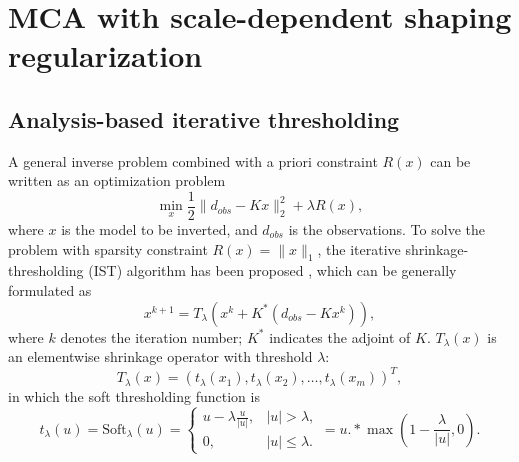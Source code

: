 \section{MCA with scale-dependent shaping regularization}

\subsection{Analysis-based iterative thresholding}

A general inverse problem combined with a priori constraint $R(x)$ can be written as an optimization problem
\begin{equation}\label{eq:sparsity3}
  \min_x \frac{1}{2}\|d_{obs}-K x\|_2^2+\lambda R(x),
\end{equation}
where $x$ is the model to be inverted, and $d_{obs}$ is the observations. To solve the problem with sparsity constraint $R(x)=\|x\|_1$, the iterative shrinkage-thresholding (IST) algorithm has been proposed  \citep{daubechies2004iterative}, which can be generally formulated as
\begin{equation}\label{eq:IST}
   x^{k+1}=T_{\lambda}(x^{k}+K^*(d_{obs}-Kx^{k})),
 \end{equation}
 where $k$ denotes the iteration number; $K^*$ indicates the adjoint of $K$. $T_{\lambda}(x)$ is an elementwise shrinkage operator with threshold $\lambda$:
 \begin{equation}
    T_{\lambda}(x)=(t_{\lambda}(x_1),t_{\lambda}(x_2),\ldots,t_{\lambda}(x_m))^T,
 \end{equation}
in which  the soft thresholding function \citep{donoho1995noising} is
 \begin{equation}
  t_{\lambda}(u)=\mathrm{Soft}_{\lambda}(u)=\left\{\begin{array}{ll}
                           u-\lambda\frac{u}{|u|}, & |u|> \lambda,\\
                           0, & |u|\leq \lambda.
                         \end{array}  \right.
	=u.*\max(1-\frac{\lambda}{|u|},0).
 \end{equation}

